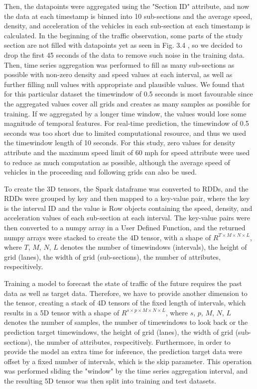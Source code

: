\documentclass[11pt]{uonthesis}
\begin{document}
Then, the datapoints were aggregated using the "Section ID" attribute, and now the data at each timestamp is binned into 10 sub-sections and the average speed, density, and acceleration of the vehicles in each sub-section at each timestamp is calculated. In the beginning of the traffic observation, some parts of the study section are not filled with datapoints yet as seen in Fig. 3.4 %
, so we decided to drop the first 45 seconds of the data to remove such noise in the training data. Then, time series aggregation was performed to fill as many sub-sections as possible with non-zero density and speed values at each interval, as well as further filling null values with appropriate and plausible values. We found that for this particular dataset the timewindow of 0.5 seconds is most favourable since the aggregated values cover all grids and creates as many samples as possible for training. If we aggregated by a longer time window, the values would lose some magnitude of temporal features. For real-time prediction, the timewindow of 0.5 seconds was too short due to limited computational resource, and thus we used the timewindow length of 10 seconds. For this study, zero values for density attribute and the maximum speed limit of 60 mph for speed attribute were used to reduce as much computation as possible, although the average speed of vehicles in the proceeding and following grids can also be used. 

To create the 3D tensors, the Spark dataframe was converted to RDDs, and the RDDs were grouped by key and then mapped to a key-value pair, where the key is the interval ID and the value is Row objects containing the speed, density, and acceleration values of each sub-section at each interval. The key-value pairs were then converted to a numpy array in a User Defined Function, and the returned numpy arrays were stacked to create the 4D tensor, with a shape of $R^{T{\times}M{\times}N{\times}L}$, where $T$, $M$, $N$, $L$ denotes the number of timewindows (intervals), the height of grid (lanes), the width of grid (sub-sections), the number of attributes, respecitively. %

Training a model to forecast the state of traffic of the future requires the past data as well as target data. Therefore, we have to provide another dimension to the tensor, creating a stack of 4D tensors of the fixed length of intervals, which results in a 5D tensor with a shape of $R^{s{\times}p{\times}M{\times}N{\times}L}$, where $s$, $p$, $M$, $N$, $L$ denotes the number of samples, the number of timewindows to look back or the prediction target timewindows, the height of grid (lanes), the width of grid (sub-sections), the number of attributes, respecitively. Furthermore, in order to provide the model an extra time for inference, the prediction target data were offset by a fixed number of intervals, which is the skip parameter. This operation was performed sliding the "window" by the time series aggregation interval, and the resulting 5D tensor was then split into training and test datasets. %
\end{document}
